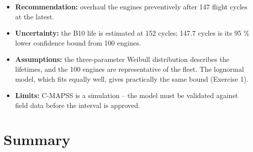 \documentclass[
  letterpaper,
  DIV=11,
  numbers=noendperiod]{scrreprt}
\providecommand{\tightlist}{%
  \setlength{\itemsep}{0pt}\setlength{\parskip}{0pt}}\usepackage{longtable,booktabs,array}
\begin{document}
\begin{tcolorbox}[enhanced jigsaw, left=2mm, title=\textcolor{quarto-callout-important-color}{\faExclamation}\hspace{0.5em}{Recommendation to the fleet manager}, opacityback=0, breakable, rightrule=.15mm, arc=.35mm, toptitle=1mm, colbacktitle=quarto-callout-important-color!10!white, opacitybacktitle=0.6, coltitle=black, colframe=quarto-callout-important-color-frame, bottomrule=.15mm, leftrule=.75mm, bottomtitle=1mm, titlerule=0mm, toprule=.15mm, colback=white]

\begin{itemize}
\tightlist
\item
  \textbf{Recommendation:} overhaul the engines preventively after 147
  flight cycles at the latest.
\item
  \textbf{Uncertainty:} the B10 life is estimated at 152 cycles; 147.7
  cycles is its 95 \% lower confidence bound from 100 engines.
\item
  \textbf{Assumptions:} the three-parameter Weibull distribution
  describes the lifetimes, and the 100 engines are representative of the
  fleet. The lognormal model, which fits equally well, gives practically
  the same bound (Exercise 1).
\item
  \textbf{Limits:} C-MAPSS is a simulation -- the model must be
  validated against field data before the interval is approved.
\end{itemize}

\end{tcolorbox}

\section{Summary}\label{summary-3}
\end{document}
